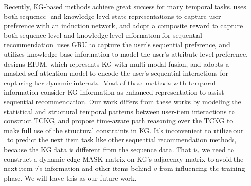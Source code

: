 Recently, KG-based methods achieve great success for many temporal tasks.
\cite{kerl} uses both sequence- and knowledge-level state representations to capture user preference with an induction network, and adopt a composite reward to capture both sequence-level and knowledge-level information for sequential recommendation.
\cite{KSR} uses GRU to capture the user’s sequential preference, and utilizes knowledge base information to model the user’s attribute-level preference.
\cite{huang2019explainable} designs EIUM, which represents KG with 
multi-modal fusion, and adopts a masked self-attention model to encode the user’s sequential interactions for capturing her dynamic interests.
Most of those methods with temporal information consider KG information as enhanced representation to assist sequential recommendation.
Our work differs from these works by modeling the statistical and structural 
temporal patterns between user-item interactions to construct TCKG, and propose time-aware path reasoning over the TCKG to make full use of the structural constraints in KG. It's inconvenient to utilize our \tkgrec\ to predict the next item task like other sequential recommendation methods, because the KG data is different from the sequence data. That is, we need to construct a dynamic edge MASK matrix on KG's adjacency matrix to avoid the next item $v$'s information and other items behind $v$ from influencing the training phase. We will leave this as our future work.
















